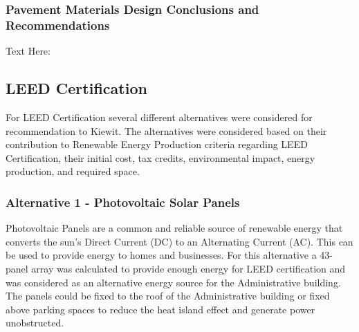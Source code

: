 \documentclass{ceri}
\begin{document}
\begin{table}[H]
\centering
\caption{Pavement Materials Design Decision Matrix}
\label{my-label}
\end{table}

\subsubsection{Pavement Materials Design Conclusions and Recommendations}
Text Here:
\newpage 
\subsection{LEED Certification}
For LEED Certification several different alternatives were considered for recommendation to Kiewit. The alternatives were considered based on their contribution to Renewable Energy Production criteria regarding LEED Certification, their initial cost, tax credits, environmental impact, energy production, and required space.

\subsubsection{Alternative 1 - Photovoltaic Solar Panels}
Photovoltaic Panels are a common and reliable source of renewable energy that converts the sun’s Direct Current (DC) to an Alternating Current (AC). This can be used to provide energy to homes and businesses. For this alternative a 43-panel array was calculated to provide enough energy for LEED certification and was considered as an alternative energy source for the Administrative building. The panels could be fixed to the roof of the Administrative building or fixed above parking spaces to reduce the heat island effect and generate power unobstructed.
\end{document}
